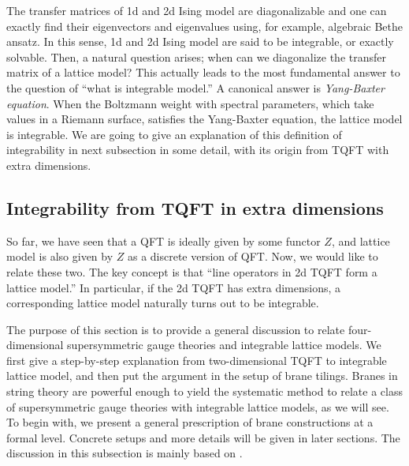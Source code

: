 The transfer matrices of 1d and 2d Ising model are diagonalizable
and one can exactly find their eigenvectors and eigenvalues using,
for example, algebraic Bethe ansatz. In this sense, 1d and 2d Ising
model are said to be integrable, or exactly solvable. Then, a natural
question arises; when can we diagonalize the transfer matrix of a
lattice model? This actually leads to the most fundamental answer
to the question of ``what is integrable model.'' A canonical answer
is \emph{Yang-Baxter equation}. When the Boltzmann weight with spectral
parameters, which take values in a Riemann surface, satisfies the
Yang-Baxter equation, the lattice model is integrable. We are going to give
an explanation of this definition of integrability in next subsection
in some detail, with its origin from TQFT with extra dimensions.







\subsection{Integrability from TQFT in extra dimensions}

So far, we have seen that a QFT is ideally given by some functor $Z$, and
lattice model is also given by $Z$ as a discrete version of QFT.
Now, we would like to relate these two. The key concept is that
``line operators in 2d TQFT form a lattice model.''
In particular, if the 2d TQFT has extra dimensions, a corresponding
lattice model naturally turns out to be integrable.


The purpose of this section is to provide a general discussion to relate four-dimensional
supersymmetric gauge theories and integrable lattice models.
We first give a step-by-step
explanation from two-dimensional TQFT to integrable lattice model,
and then put the argument in the setup of brane tilings. Branes in
string theory are powerful enough to yield the systematic method to
relate a class of supersymmetric gauge theories with integrable lattice
models, as we will see. To begin with, we present a general prescription
of brane constructions at a formal level. Concrete setups and more
details will be given in later sections.
The discussion in this subsection is mainly based on \cite{Yagi:2016oum}.





